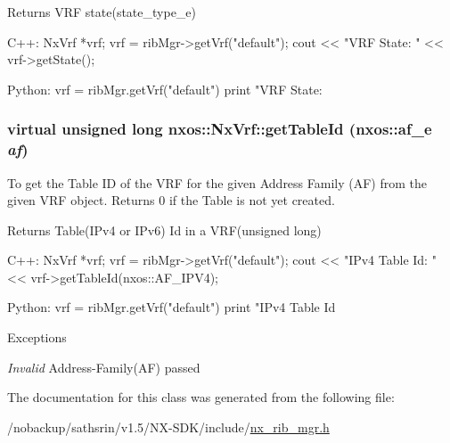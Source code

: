 \begin{DoxyReturn}{Returns}
VRF state(state\_\-type\_\-e)
\end{DoxyReturn}

\begin{DoxyCode}
  C++:
       NxVrf *vrf;
       vrf = ribMgr->getVrf("default");
       cout << "VRF State: " << vrf->getState();

  Python:
       vrf = ribMgr.getVrf("default")
       print "VRF State: %
\end{DoxyCode}
 \hypertarget{classnxos_1_1NxVrf_a6f1529908decf0dfb531e674440d82ed}{
\subsubsection[{getTableId}]{\setlength{\rightskip}{0pt plus 5cm}virtual unsigned long nxos::NxVrf::getTableId (nxos::af\_\-e {\em af})}}
\label{classnxos_1_1NxVrf_a6f1529908decf0dfb531e674440d82ed}
To get the Table ID of the VRF for the given Address Family (AF) from the given VRF object. Returns 0 if the Table is not yet created.

\begin{DoxyReturn}{Returns}
Table(IPv4 or IPv6) Id in a VRF(unsigned long)
\end{DoxyReturn}

\begin{DoxyCode}
  C++:
       NxVrf *vrf;
       vrf = ribMgr->getVrf("default");
       cout << "IPv4 Table Id: " << vrf->getTableId(nxos::AF_IPV4);

  Python:
       vrf = ribMgr.getVrf("default")
       print "IPv4 Table Id %
\end{DoxyCode}



\begin{DoxyExceptions}{Exceptions}
\item[{\em Invalid}]Address-\/Family(AF) passed \end{DoxyExceptions}


The documentation for this class was generated from the following file:\begin{DoxyCompactItemize}
\item 
/nobackup/sathsrin/v1.5/NX-\/SDK/include/\hyperlink{nx__rib__mgr_8h}{nx\_\-rib\_\-mgr.h}\end{DoxyCompactItemize}
